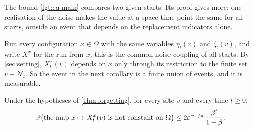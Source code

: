 The bound \eqref{fgt:eq-main} compares two given starts. Its proof gives more: one realisation of the noise makes the value at a space-time point the same for all starts, outside an event that depends on the replacement indicators alone.

Run every configuration $x\in\Omega$ with the same variables $\eta_t(v)$ and $\zeta_t(v)$, and write $X^x$ for the run from $x$; this is the common-noise coupling of all starts. By \cref{sec:setting}, $X^x_t(v)$ depends on $x$ only through its restriction to the finite set $v+\mathcal N_t$. So the event in the next corollary is a finite union of events, and it is measurable.

\begin{corollary}\label{fgt:coalesce}
Under the hypotheses of \cref{thm:forgetting}, for every site $v$ and every time $t\ge0$,
\begin{equation}\label{fgt:eq-coalesce}
\mathbb{P}\bigl(\text{the map }x\mapsto X^x_t(v)\text{ is not constant on }\Omega\bigr)\le 2\varepsilon^{-\tau/a}\,\frac{\beta^t}{1-\beta}.
\end{equation}
\end{corollary}

